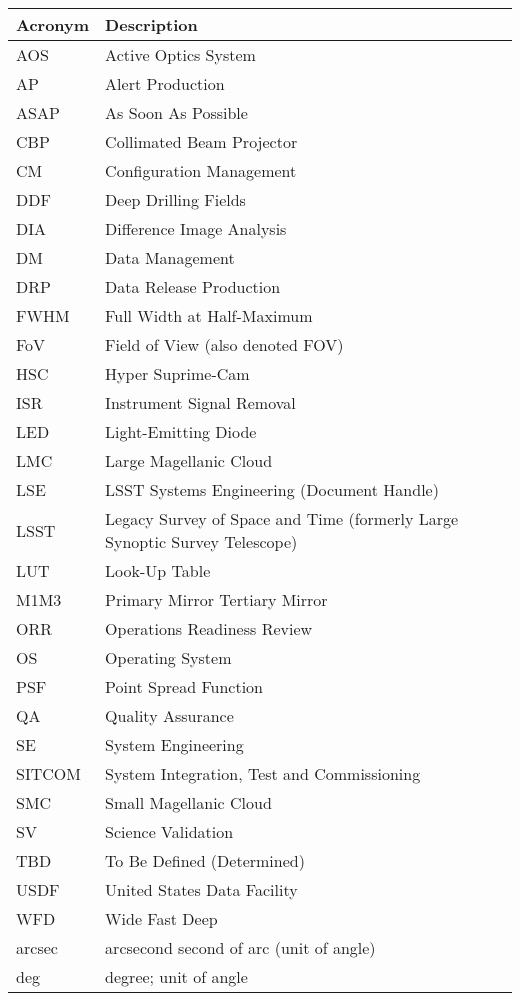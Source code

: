 \addtocounter{table}{-1}
\begin{longtable}{p{}p{}}\hline
\textbf{Acronym} & \textbf{Description}  \\\hline

AOS & Active Optics System \\\hline
AP & Alert Production \\\hline
ASAP & As Soon As Possible \\\hline
CBP & Collimated Beam Projector \\\hline
CM & Configuration Management \\\hline
DDF & Deep Drilling Fields \\\hline
DIA & Difference Image Analysis \\\hline
DM & Data Management \\\hline
DRP & Data Release Production \\\hline
FWHM & Full Width at Half-Maximum \\\hline
FoV & Field of View (also denoted FOV) \\\hline
HSC & Hyper Suprime-Cam \\\hline
ISR & Instrument Signal Removal \\\hline
LED & Light-Emitting Diode \\\hline
LMC & Large Magellanic Cloud \\\hline
LSE & LSST Systems Engineering (Document Handle) \\\hline
LSST & Legacy Survey of Space and Time (formerly Large Synoptic Survey Telescope) \\\hline
LUT & Look-Up Table \\\hline
M1M3 & Primary Mirror Tertiary Mirror \\\hline
ORR & Operations Readiness Review \\\hline
OS & Operating System \\\hline
PSF & Point Spread Function \\\hline
QA & Quality Assurance \\\hline
SE & System Engineering \\\hline
SITCOM & System Integration, Test and Commissioning \\\hline
SMC & Small Magellanic Cloud \\\hline
SV & Science Validation \\\hline
TBD & To Be Defined (Determined) \\\hline
USDF & United States Data Facility \\\hline
WFD & Wide Fast Deep \\\hline
arcsec & arcsecond second of arc (unit of angle) \\\hline
deg & degree; unit of angle \\\hline
\end{longtable}

